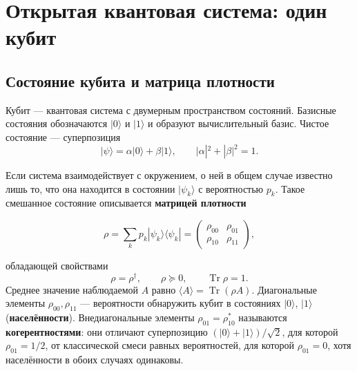 \documentclass[12pt,a4paper]{report}
\numberwithin{equation}{chapter}
\newcommand{\Tr}{\operatorname{Tr}}
\newcommand{\ket}[1]{|#1\rangle}
\newcommand{\bra}[1]{\langle #1|}
\begin{document}
\chapter{Открытая квантовая система: один кубит}
\label{chap:qubit}

\section{Состояние кубита и матрица плотности}

Кубит --- квантовая система с двумерным пространством состояний. Базисные
состояния обозначаются $\ket0$ и $\ket1$ и образуют вычислительный базис.
Чистое состояние --- суперпозиция
\begin{equation}
\ket\psi=\alpha\ket0+\beta\ket1,\qquad |\alpha|^2+|\beta|^2=1 .
\end{equation}

Если система взаимодействует с окружением, о ней в общем случае известно
лишь то, что она находится в состоянии $\ket{\psi_k}$ с вероятностью $p_k$.
Такое смешанное состояние описывается \textbf{матрицей плотности}
\begin{keybox}
\begin{equation}
\rho=\sum_kp_k\ket{\psi_k}\bra{\psi_k}
=\begin{pmatrix}\rho_{00}&\rho_{01}\\ \rho_{10}&\rho_{11}\end{pmatrix},
\label{eq:rho}
\end{equation}
\end{keybox}
обладающей свойствами
\begin{equation}
\rho=\rho^\dagger,\qquad \rho\succeq0,\qquad \Tr\rho=1 .
\end{equation}
Среднее значение наблюдаемой $A$ равно $\langle A\rangle=\Tr(\rho A)$.
Диагональные элементы $\rho_{00},\rho_{11}$ --- вероятности обнаружить кубит
в состояниях $\ket0$, $\ket1$ (\textbf{населённости}). Внедиагональные
элементы $\rho_{01}=\rho_{10}^*$ называются \textbf{когерентностями}: они
отличают суперпозицию $(\ket0+\ket1)/\sqrt2$, для которой $\rho_{01}=1/2$, от
классической смеси равных вероятностей, для которой $\rho_{01}=0$, хотя
населённости в обоих случаях одинаковы.
\end{document}
